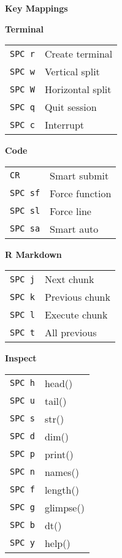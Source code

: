 \documentclass[10pt,a4paper]{article}
\begin{document}
\begin{multicols}{3}
\footnotesize

\textbf{Key Mappings}

\textbf{Terminal}\\
\begin{tabular}{@{}L{0.6cm}L{1.8cm}@{}}
\texttt{SPC r} & Create terminal \\
\texttt{SPC w} & Vertical split \\
\texttt{SPC W} & Horizontal split \\
\texttt{SPC q} & Quit session \\
\texttt{SPC c} & Interrupt \\
\end{tabular}

\vspace{3pt}
\textbf{Code}\\
\begin{tabular}{@{}L{0.6cm}L{1.8cm}@{}}
\texttt{CR} & Smart submit \\
\texttt{SPC sf} & Force function \\
\texttt{SPC sl} & Force line \\
\texttt{SPC sa} & Smart auto \\
\end{tabular}

\vspace{3pt}
\textbf{R Markdown}\\
\begin{tabular}{@{}L{0.6cm}L{1.8cm}@{}}
\texttt{SPC j} & Next chunk \\
\texttt{SPC k} & Previous chunk \\
\texttt{SPC l} & Execute chunk \\
\texttt{SPC t} & All previous \\
\end{tabular}

\vspace{3pt}
\textbf{Inspect}\\
\begin{tabular}{@{}L{0.6cm}L{1.8cm}@{}}
\texttt{SPC h} & head() \\
\texttt{SPC u} & tail() \\
\texttt{SPC s} & str() \\
\texttt{SPC d} & dim() \\
\texttt{SPC p} & print() \\
\texttt{SPC n} & names() \\
\texttt{SPC f} & length() \\
\texttt{SPC g} & glimpse() \\
\texttt{SPC b} & dt() \\
\texttt{SPC y} & help() \\
\end{tabular}


\end{multicols}
\end{document}
